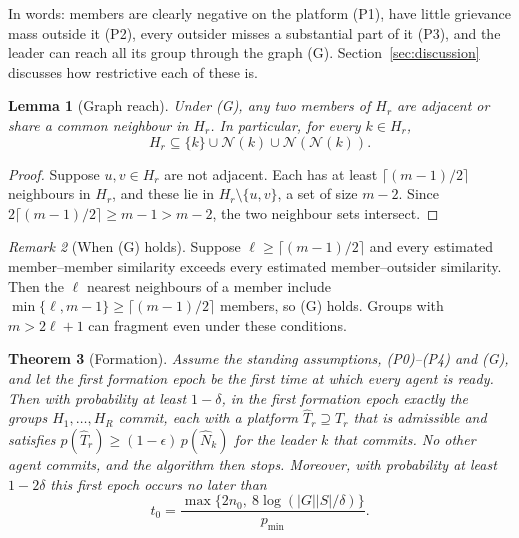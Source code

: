 \documentclass[11pt]{article}
\newcommand{\nb}{\mathcal{N}}   %
\theoremstyle{plain}
\newtheorem{theorem}{Theorem}[section]
\newtheorem{lemma}[theorem]{Lemma}
\theoremstyle{definition}
\theoremstyle{remark}
\newtheorem{remark}[theorem]{Remark}
\begin{document}
In words: members are clearly negative on the platform (P1), have little grievance mass outside it (P2), every outsider misses a substantial part of it (P3), and the leader can reach all its group through the graph (G).
Section~\ref{sec:discussion} discusses how restrictive each of these is.
 
\begin{lemma}[Graph reach]\label{lem:graph}
Under (G), any two members of $H_r$ are adjacent or share a common neighbour in $H_r$. In particular, for every $k\in H_r$,
\[ H_r\subseteq\{k\}\cup\nb(k)\cup\nb(\nb(k)). \]
\end{lemma}
\begin{proof}
Suppose $u,v\in H_r$ are not adjacent. Each has at least $\lceil(m-1)/2\rceil$ neighbours in $H_r$, and these lie in $H_r\setminus\{u,v\}$, a set of size $m-2$. Since
$2\lceil(m-1)/2\rceil\ge m-1>m-2$, the two neighbour sets intersect.
\end{proof}
 
\begin{remark}[When (G) holds]
Suppose $\ell\ge\lceil(m-1)/2\rceil$ and every estimated member--member similarity exceeds every estimated member--outsider similarity. Then the $\ell$ nearest neighbours of a member
include $\min\{\ell,m-1\}\ge\lceil(m-1)/2\rceil$ members, so (G) holds. Groups with $m>2\ell+1$ can fragment even under these conditions.
\end{remark}
 
\begin{theorem}[Formation]\label{thm:formation}
Assume the standing assumptions, (P0)--(P4) and (G), and let the first formation epoch be the first time at which every agent is ready.
Then with probability at least $1-\delta$, in the first formation epoch exactly the groups $H_1,\dots,H_R$ commit, each with a platform $\hat T_r\supseteq T_r$ that is admissible and satisfies
$p(\hat T_r)\ge(1-\epsilon)\,p(\hat N_k)$ for the leader $k$ that commits. No other agent commits, and the algorithm then stops.
Moreover, with probability at least $1-2\delta$ this first epoch occurs no later than
\[ t_0=\frac{\max\{2n_0,\ 8\log(|G||S|/\delta)\}}{p_{\min}}. \]
\end{theorem}
 
\end{document}
